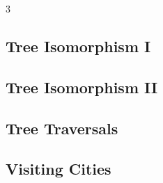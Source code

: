 \documentclass[8pt]{extarticle}
\begin{document}
\begin{multicols*}{3}
\subsection{Tree Isomorphism I}
\begin{caixaenunciado}

\end{caixaenunciado}
\vspace{0.3cm}


\subsection{Tree Isomorphism II}
\begin{caixaenunciado}

\end{caixaenunciado}
\vspace{0.3cm}


\subsection{Tree Traversals}
\begin{caixaenunciado}

\end{caixaenunciado}
\vspace{0.3cm}


\subsection{Visiting Cities}
\begin{caixaenunciado}

\end{caixaenunciado}
\vspace{0.3cm}

\end{multicols*}
\pagebreak
\end{document}
